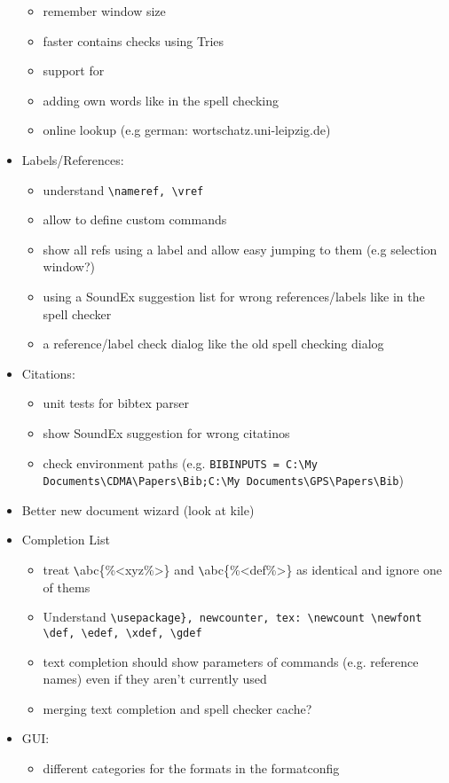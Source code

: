 \documentclass[10pt,a4paper,landscape]{report}
\begin{document}
\begin{itemize}
\begin{itemize}
		\item remember window size
		\item faster contains checks using Tries
		\item support for 
		\item adding own words like in the spell checking 
		\item online lookup (e.g german: wortschatz.uni-leipzig.de)
	\end{itemize}
	\item Labels/References: \begin{itemize}
		\item understand \verb+\nameref, \vref+
		\item allow to define custom commands
		\item 	show all refs using a label and allow easy jumping to them (e.g selection window?)
		\item using a SoundEx suggestion list for wrong references/labels like in the spell checker
		\item a reference/label check dialog like the old spell checking dialog
	\end{itemize}
	\item Citations: \begin{itemize}
		\item unit tests for bibtex parser
		\item show SoundEx suggestion for wrong citatinos
		\item check environment paths (e.g. \verb+BIBINPUTS = C:\My Documents\CDMA\Papers\Bib;C:\My Documents\GPS\Papers\Bib+)
	\end{itemize}
	\item Better new document wizard (look at kile)
	\item Completion List \begin{itemize}
		\item treat \verb+\+abc\{\%<xyz\%>\} and \verb+\+abc\{\%<def\%>\} as identical and ignore one of thems
		\item Understand \verb+\usepackage}, newcounter, tex: \newcount \newfont \def, \edef, \xdef, \gdef+
		\item text completion should show parameters of commands (e.g. reference names) even if they aren't currently used
		\item merging text completion and spell checker cache?
	\end{itemize}
	\item GUI: \begin{itemize}
		\item different categories for the formats in the formatconfig

\end{itemize}
\end{itemize}
\end{document}

